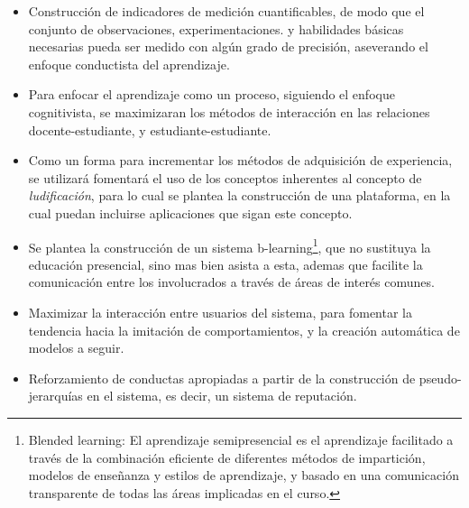 \begin{itemize}
\item Construcción de indicadores de medición cuantificables, de
modo que el conjunto de observaciones, experimentaciones. y habilidades básicas 
necesarias pueda ser medido con algún grado de precisión, aseverando el enfoque
conductista del aprendizaje.
\item Para enfocar el aprendizaje como un proceso, siguiendo el enfoque
cognitivista, se maximizaran los métodos de interacción en las relaciones
docente-estudiante, y estudiante-estudiante.
\item Como un forma para incrementar los métodos de adquisición de experiencia,
se utilizará fomentará el uso de los conceptos inherentes al concepto de 
\emph{ludificación}, para lo cual se plantea la construcción de una plataforma,
en la cual puedan incluirse aplicaciones que sigan este concepto.
\item Se plantea la construcción de un sistema b-learning\footnote{Blended
learning: El aprendizaje semipresencial es el aprendizaje facilitado a través
de la combinación eficiente de diferentes métodos de impartición, modelos de
enseñanza y estilos de aprendizaje, y basado en una comunicación transparente
de todas las áreas implicadas en el curso.}, que no sustituya la educación
presencial, sino mas bien asista a esta, ademas que facilite la comunicación
entre los involucrados a través de áreas de interés comunes.
\item Maximizar la interacción entre usuarios del sistema, para fomentar la
tendencia hacia la imitación de comportamientos, y la creación automática de
modelos a seguir.
\item Reforzamiento de conductas apropiadas a partir de la construcción de pseudo-jerarquías en el sistema, es decir, un sistema de reputación.
\end{itemize}
